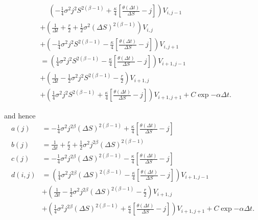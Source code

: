 \begin{align*}
		&\phantom{+} \left(-\frac{1}{4}\sigma^2j^2S^{2(\beta -1)}+ \frac{\kappa}{4}\left[\frac{\theta(\Delta t)}{\Delta S} - j\right]\right)V_{i,j-1} \\
		&+ \left(\frac{1}{\Delta t} + \frac{r}{2} + \frac{1}{2}\sigma^2 \left(\Delta S\right)^{2(\beta - 1)} \right)V_{i,j} \\
		&+ \left( -\frac{1}{4}\sigma^2j^2S^{2(\beta -1)} - \frac{\kappa}{4}\left[\frac{\theta(\Delta t)}{\Delta S} - j\right]\right) V_{i, j+1}\\
		&= \left(\frac{1}{4}\sigma^2 j^2S^{2(\beta - 1)} - \frac{\kappa}{4}\left[\frac{\theta(\Delta t)}{\Delta S} - j\right]\right)V_{i+1,j-1}\\
		&+ \left(\frac{1}{\Delta t } - \frac{1}{2}\sigma^2 j^2S^{2(\beta - 1)}  - \frac{r}{2}\right)V_{i+1,j}\\
		&+ \left(\frac{1}{4}\sigma^2 j^2S^{2(\beta - 1)}+ \frac{\kappa}{4}\left[\frac{\theta(\Delta t)}{\Delta S} - j\right]\right)V_{i+1,j+1} + C \exp{-\alpha \Delta t}.
\end{align*}

and hence
\begin{equation}
	\begin{aligned}
		a(j) &= -\frac{1}{4}\sigma^2j^{2\beta}(\Delta S)^{2(\beta -1) }+ \frac{\kappa}{4}\left[\frac{\theta(\Delta t)}{\Delta S} - j\right] \\
		b(j) &= \frac{1}{\Delta t} + \frac{r}{2} + \frac{1}{2}\sigma^2 j^{2\beta}(\Delta S)^{2(\beta -1) }\\
		c(j) &=  -\frac{1}{4}\sigma^2j^{2\beta}(\Delta S)^{2(\beta -1) } - \frac{\kappa}{4}\left[\frac{\theta(\Delta t)}{\Delta S} - j\right]\\
		d(i,j)&=\left(\frac{1}{4}\sigma^2 j^{2\beta}(\Delta S)^{2(\beta -1) } - \frac{\kappa}{4}\left[\frac{\theta(\Delta t)}{\Delta S} - j\right]\right)V_{i+1,j-1}\\
		&+ \left(\frac{1}{\Delta t } - \frac{1}{2}\sigma^2 j^{2\beta}(\Delta S)^{2(\beta -1) }  - \frac{r}{2}\right)V_{i+1,j}\\
		&+ \left(\frac{1}{4}\sigma^2 j^{2\beta}(\Delta S)^{2(\beta -1) }+ \frac{\kappa}{4}\left[\frac{\theta(\Delta t)}{\Delta S} - j\right]\right)V_{i+1,j+1} + C \exp{-\alpha \Delta t}.
	\end{aligned}
\end{equation}

